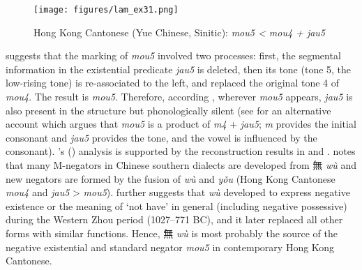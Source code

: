 \documentclass[output=paper]{langscibook}
\begin{document}
\begin{figure}
	\caption{Hong Kong Cantonese (Yue Chinese, Sinitic): \textit{mou5 < mou4 + jau5}}
	\label{ex:lam31}
	\texttt{[image: figures/lam\_ex31.png]}
\end{figure}

\citeauthor{Law2014} suggests that the marking of \textit{mou5} involved two processes: first, the segmental information in the existential predicate \textit{jau5} is deleted, then its tone (tone 5, the low-rising tone) is re-associated to the left, and replaced the original tone 4 of \textit{mou4}. The result is \textit{mou5}. Therefore, according \citeauthor{Law2014}, wherever \textit{mou5} appears, \textit{jau5} is also present in the structure but phonologically silent (see \citealt{Yue2001} for an alternative account which argues that \textit{mou5} is a product of \textit{m4} + \textit{jau5}; \textit{m} provides the initial consonant and \textit{jau5} provides the tone, and the vowel is influenced by the consonant). \citeauthor{Law2014}'s (\citeyear{Law2014}) analysis is supported by the reconstruction results in \citet{Norman1988} and \citet{Schuessler2007}. \citet[213]{Norman1988} notes that many M-negators in Chinese southern dialects are developed from 無 \textit{wù} and new negators are formed by the fusion of \textit{wù} and \textit{yǒu} (Hong Kong Cantonese \textit{mou4} and \textit{jau5} > \textit{mou5}). \citet[518--519]{Schuessler2007} further suggests that \textit{wù} developed to express negative existence or the meaning of `not have' in general (including negative possessive) during the Western Zhou period (1027–771 BC), and it later replaced all other forms with similar functions. Hence, 無 \textit{wù} is most probably the source of the negative existential and standard negator \textit{mou5} in contemporary Hong Kong Cantonese. 
\end{document}
